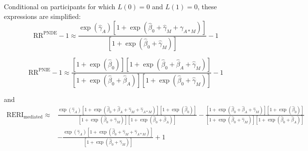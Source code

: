 \documentclass[
]{book}
\begin{document}
Conditional on participants for which \(L(0)=0\) and \(L(1)=0\), these expressions are simplified:
\[\text{RR}^\text{PNDE} - 1 \approx \frac{ \exp \left( \hat{\gamma}_A \right) \left[ 1 + \exp \left( \hat{\beta}_0 + \hat{\gamma}_M + \hat{\gamma}_{A \ast M} \right) \right]}{ \left[ 1 + \exp \left( \hat{\beta}_0 + \hat{\gamma}_M \right) \right] } - 1 \]

\[\text{RR}^\text{PNIE} - 1 \approx \frac{\left[ 1 + \exp \left( \hat{\beta}_0 \right) \right] \left[ 1 + \exp \left( \hat{\beta}_0 + \hat{\beta}_A + \hat{\gamma}_M \right) \right]}{\left[ 1 + \exp \left( \hat{\beta}_0 + \hat{\beta}_A \right) \right] \left[ 1 + \exp \left( \hat{\beta}_0 + \hat{\gamma}_M \right) \right] } - 1 \]

and
\[\begin{array}{rl}
\text{RERI}_\text{mediated} \approx  & \frac{ \exp \left( \hat{\gamma}_A \right) \left[1 + \exp \left(\hat{\beta}_0 + \hat{\beta}_A + \hat{\gamma}_M + \hat{\gamma}_{A \ast M} \right) \right] \left[1 + \exp \left(\hat{\beta}_0 \right) \right]}{\left[ 1 + \exp \left(\hat{\beta}_0 + \hat{\gamma}_M \right)\right] \left[ 1 + \exp \left(\hat{\beta}_0 + \hat{\beta}_A \right) \right]}  - \frac{\left[1 + \exp \left(\hat{\beta}_0 + \hat{\beta}_A + \hat{\gamma}_M \right) \right] \left[1 + \exp \left(\hat{\beta}_0 \right) \right]}{\left[ 1 + \exp \left(\hat{\beta}_0 + \hat{\gamma}_M \right)\right] \left[ 1 + \exp \left(\hat{\beta}_0 + \hat{\beta}_A \right) \right]} \\
                                & - \frac{ \exp \left( \hat{\gamma}_A \right) \left[1 + \exp \left(\hat{\beta}_0 + \hat{\gamma}_M + \hat{\gamma}_{A \ast M} \right) \right]}{\left[ 1 + \exp \left(\hat{\beta}_0 + \hat{\gamma}_M \right)\right]} + 1
\end{array}\]
\end{document}
